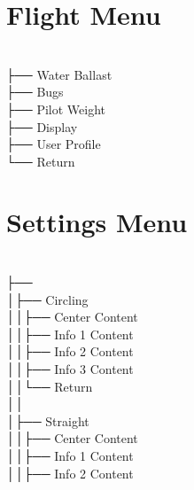 \section{Flight Menu}
\menufont
{} \\
├── Water Ballast \\
├── Bugs \\
├── Pilot Weight \\
├── Display \\
├── User Profile \\
└── Return \\
\sffamily
\newpage

\section{Settings Menu}
\menufont
{} \\
├──  \\
│\hspace{2em}├── Circling \\
│\hspace{2em}│\hspace{2em}├── Center Content \\
│\hspace{2em}│\hspace{2em}├── Info 1 Content \\
│\hspace{2em}│\hspace{2em}├── Info 2 Content \\
│\hspace{2em}│\hspace{2em}├── Info 3 Content \\
│\hspace{2em}│\hspace{2em}└── Return \\
│\hspace{2em}│\hspace{2em} \\
│\hspace{2em}├── Straight \\
│\hspace{2em}│\hspace{2em}├── Center Content \\
│\hspace{2em}│\hspace{2em}├── Info 1 Content \\
│\hspace{2em}│\hspace{2em}├── Info 2 Content \\
